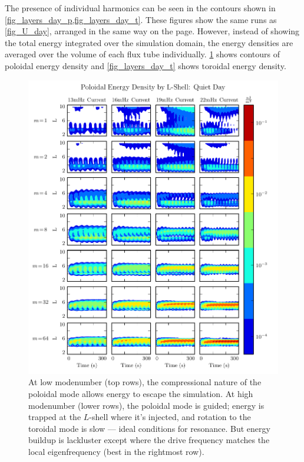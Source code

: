 The presence of individual harmonics can be seen in the contours shown in
\cref{fig_layers_day_p,fig_layers_day_t}. These figures show the same runs as
\cref{fig_U_day}, arranged in the same way on the page. However, instead of
showing the total energy integrated over the simulation domain, the energy
densities are averaged over the volume of each flux tube individually.
\cref{fig_layers_day_p} shows contours of poloidal energy density and
\cref{fig_layers_day_t} shows toroidal energy density. 

\begin{figure}[!htb]
  \centering
  \includegraphics[width=\textwidth]{figures/layers_day_p.pdf}
  \caption[Dayside Poloidal Energy Distribution]{
    At low modenumber (top rows), the compressional nature of the poloidal mode
    allows energy to escape the simulation. At high modenumber (lower rows),
    the poloidal mode is guided; energy is trapped at the $L$-shell where it's
    injected, and rotation to the toroidal mode is slow --- ideal conditions
    for resonance. But energy buildup is lackluster except where the drive
    frequency matches the local eigenfrequency (best in the rightmost row). 
  }
  \label{fig_layers_day_p}
\end{figure}

